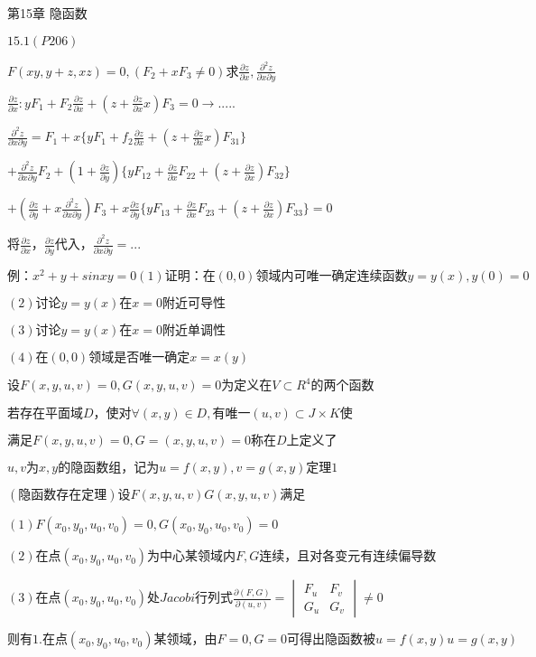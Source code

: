 \documentclass[12pt,a4paper]{article}
\begin{document}



第15章 隐函数

$15.1(P206)$

$F(xy,y+z,xz)=0,(F_2+xF_3 \ne 0)求\frac{\partial z}{\partial x},\frac{\partial ^2z}{\partial x \partial y}$

$\frac{\partial z}{\partial x}:yF_1+F_2 \frac{\partial z}{\partial x} + (z+\frac{\partial z}{\partial x} x)F_3=0 \to .....$

$\frac{\partial ^2z}{\partial x \partial y}=F_1+x\{yF_1+f_2 \frac{\partial z}{\partial x} +(z+\frac{\partial z}{\partial x} x)F_{31}\}$

$+\frac{\partial ^2z}{\partial x \partial y} F_2+(1+\frac{\partial z}{\partial y})\{yF_{12}+\frac{\partial z}{\partial x}F_{22}+(z+\frac{\partial z}{\partial x})F_{32}\}$

$+(\frac{\partial z}{\partial y}+x \frac{\partial ^2z}{\partial x \partial y})F_3+x\frac{\partial z}{\partial y}\{yF_{13}+\frac{\partial z}{\partial x}F_{23}+(z+\frac{\partial z}{\partial x})F_{33}\}=0$

$将\frac{\partial z}{\partial x}，\frac{\partial z}{\partial y}代入，\frac{\partial ^2z}{\partial x \partial y}=...$

$例：x^2+y+sinxy=0(1)证明：在(0,0)领域内可唯一确定连续函数y=y(x),y(0)=0$

$(2)讨论y=y(x)在x=0附近可导性$

$(3)讨论y=y(x)在x=0附近单调性$

$(4)在(0,0)领域是否唯一确定x=x(y)$

$设F(x,y,u,v)=0,G(x,y,u,v)=0为定义在V \subset R^4的两个函数$

$若存在平面域D，使对\forall (x,y) \in D,有唯一(u,v) \subset J×K 使$

$满足F(x,y,u,v)=0,G=(x,y,u,v)=0称在D上定义了$

$u,v为x,y的隐函数组，记为u=f(x,y),v=g(x,y)定理1$

$(隐函数存在定理)设F(x,y,u,v)G(x,y,u,v)满足$

$(1)F(x_0,y_0,u_0,v_0)=0,G(x_0,y_0,u_0,v_0)=0$

$(2)在点(x_0,y_0,u_0,v_0)为中心某领域内F,G连续，且对各变元有连续偏导数$

$(3)在点(x_0,y_0,u_0,v_0)处Jacobi行列式\frac{\partial (F,G)}{\partial (u,v)}= \begin{vmatrix} F_u & F_v \\ G_u & G_v \end{vmatrix} \ne 0$

$则有1.在点(x_0,y_0,u_0,v_0)某领域，由F=0,G=0可得出隐函数被u=f(x,y)u=g(x,y)$
\end{document}
